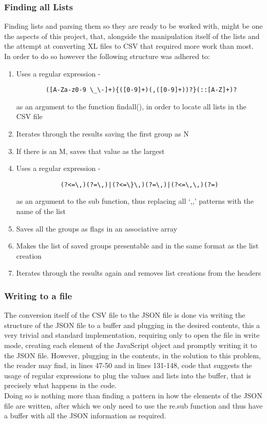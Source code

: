 \documentclass[11pt,a4paper,times]{report}
\def\JS{JavaScript\xspace}
\begin{document}
\subsubsection{Finding all Lists} Finding lists and parsing them so they
are ready to be worked with, might be one the aspects of this project,
that, alongside the manipulation itself of the lists and the attempt at
converting XL files to CSV that required more work than most. \\
In order to do so however the following structure was adhered to:
\begin{enumerate}
    \item{Uses a regular expression - 
        \begin{verbatim}
        ([A-Za-z0-9 \_\-]+){([0-9]+)(,([0-9]+))?}(::[A-Z]+)?
        \end{verbatim}
        as an argument to the function findall(), in order to locate 
        all lists in the CSV file}
    \item{Iterates through the results saving the first group as N}
    \item{If there is an M, saves that value as the largest}
    \item{Uses a regular expression -
        \begin{verbatim}
            (?<=\,)(?=\,)|(?<=\}\,)(?=\,)|(?<=\,\,)(?=)
        \end{verbatim}
        as an argument to the sub function, thus replacing all 
        `,,' patterns with the name of the list}
    \item{Saves all the groups as flags in an associative array}
    \item{Makes the list of saved groups presentable and in the same
        format as the list creation}
    \item{Iterates through the results again and removes list creations
        from the headers}
\end{enumerate}
\subsubsection{Writing to a file} The conversion itself of the CSV file
to the JSON file is done via writing the structure of the JSON file to a buffer
and plugging in the desired contents, this a very trivial and standard
implementation, requiring only to open the file in write mode, creating
each element of the \JS object and promptly writing it to the JSON file.
However, plugging in the contents, in the solution to this problem, the reader
may find, in lines 47-50 and in lines 131-148, code that suggests the usage of
regular expressions to plug the values and lists into the buffer, that is precisely
what happens in the code.\\
Doing so is nothing more than finding a pattern in how the elements of the JSON file
are written, after which we only need to use the re.sub function and thus have a 
buffer with all the JSON information as required.
\end{document}
